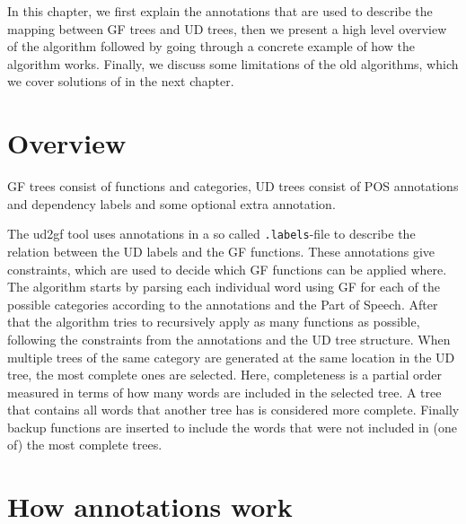 





In this chapter, we first explain the annotations that are used to describe the mapping between \ac{GF} trees and \ac{UD} trees, then we present a high level overview of the algorithm followed by going through a concrete example of how the algorithm works. Finally, we discuss some limitations of the old algorithms, which we cover solutions of in the next chapter.

\section{Overview}


\ac{GF} trees consist of functions and categories, \ac{UD} trees consist of \ac{POS} annotations and dependency labels and some optional extra annotation.

The ud2gf tool uses annotations in a so called \verb|.labels|-file to describe the relation between the \ac{UD} labels and the \ac{GF} functions. These annotations give constraints, which are used to decide which \ac{GF} functions can be applied where. The algorithm starts by parsing each individual word using \ac{GF} for each of the possible categories according to the annotations and the Part of Speech. After that the algorithm tries to recursively apply as many functions as possible, following the constraints from the annotations and the \ac{UD} tree structure. When multiple trees of the same category are generated at the same location in the \ac{UD} tree, the most complete ones are selected. Here, completeness is a partial order measured in terms of how many words are included in the selected tree. A tree that contains all words that another tree has is considered more complete. Finally backup functions are inserted to include the words that were not included in (one of) the most complete trees.

\section{How annotations work}

